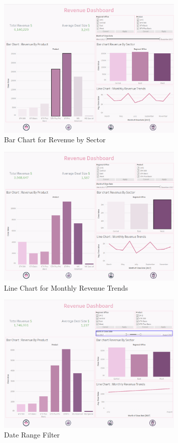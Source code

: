 \documentclass{article}
\begin{document}
\begin{figure}[h!]
    \centering
    \includegraphics[width=0.8\textwidth]{resources/swappy-20240527_152442.png}
    \caption{Bar Chart for Revenue by Sector}
    \label{fig:revenue_by_sector_bar_chart}
\end{figure}

\begin{figure}[h!]
    \centering
    \includegraphics[width=0.8\textwidth]{resources/swappy-20240527_152507.png}
    \caption{Line Chart for Monthly Revenue Trends}
    \label{fig:monthly_revenue_trends_line_chart}
\end{figure}

\begin{figure}[h!]
    \centering
    \includegraphics[width=0.8\textwidth]{resources/swappy-20240527_152550.png}
    \caption{Date Range Filter}
    \label{fig:date_range_filter}
\end{figure}
\end{document}
